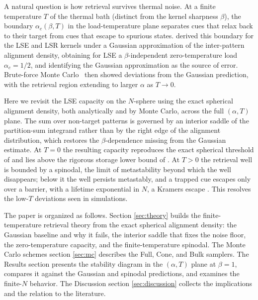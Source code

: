 \documentclass[letterpaper]{article} %
\newcommand{\Bnet}{\beta}
\begin{document}
A natural question is how retrieval survives thermal noise. At a finite
temperature $T$ of the thermal bath (distinct from the kernel sharpness $\Bnet$), the boundary
$\alpha_c(\Bnet, T)$ in the load-temperature plane separates cues that relax back
to their target from cues that escape to spurious states.
\citet{icml2026theory} derived this boundary for the LSE and LSR kernels under a
Gaussian approximation of the inter-pattern alignment density, obtaining for LSE
a $\Bnet$-independent zero-temperature load $\alpha_c = 1/2$, and identifying the 
Gaussian approximation as the source of error. Brute-force Monte
Carlo~\citep{iclr2026mc} then showed deviations from the Gaussian
prediction, with the retrieval region extending to larger $\alpha$ as $T\to0$.

Here we revisit the LSE capacity on the $N$-sphere using the exact spherical
alignment density, both analytically and by Monte Carlo, across the full
$(\alpha, T)$ plane. The sum over non-target patterns is governed by an interior
saddle of the partition-sum integrand rather than by the right edge of the
alignment distribution, which restores the $\Bnet$-dependence missing from the
Gaussian estimate. At $T = 0$ the resulting capacity reproduces the exact
spherical threshold of \citet{lucibello2024exponential} and lies above the
rigorous storage lower bound of \citet{ramsauer2021hopfield}. At $T > 0$ the
retrieval well is bounded by a spinodal, the limit of metastability beyond which
the well disappears; below it the well persists metastably, and a trapped cue
escapes only over a barrier, with a lifetime exponential in $N$, a Kramers escape
\citep{kramers1940, hanggi1990}. This resolves the low-$T$ deviations seen in
simulations.

The paper is organized as follows. Section \ref{sec:theory} builds the
finite-temperature retrieval theory from the exact spherical alignment density:
the Gaussian baseline and why it fails, the interior saddle that fixes the noise
floor, the zero-temperature capacity, and the finite-temperature spinodal. The
Monte Carlo schemes section \ref{sec:mc} describes the Full, Cone, and Bulk samplers. The
Results section presents the stability diagram in the $(\alpha, T)$ plane at
$\Bnet = 1$, compares it against the Gaussian and spinodal predictions, and
examines the finite-$N$ behavior. The Discussion section \ref{sec:discussion} collects the
implications and the relation to the literature.


\end{document}

